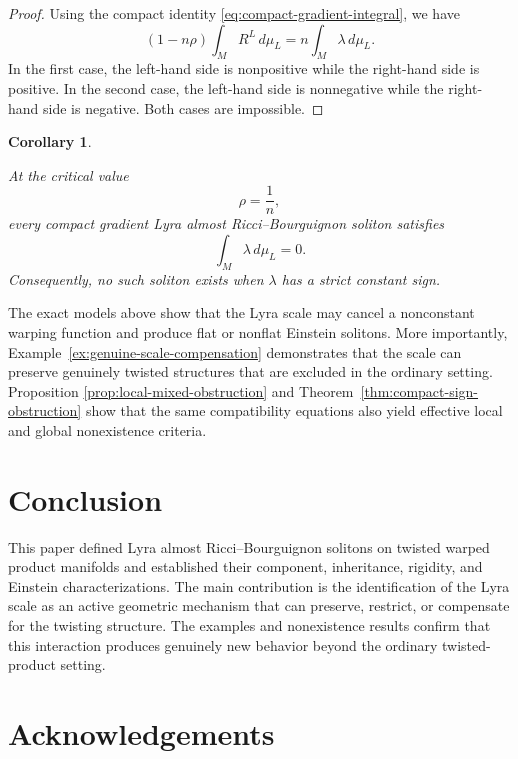 \documentclass[a4paper,11pt]{article}
\theoremstyle{plain}
\newtheorem{corollary} {Corollary}[section]
\numberwithin{equation}{section}
\begin{document}
\begin{proof}
	Using the compact identity
	\eqref{eq:compact-gradient-integral}, we have
	\[
	(1-n\rho)
	\int_{M}R^{L}\,d\mu_{L}
	=
	n
	\int_{M}\lambda\,d\mu_{L}.
	\]
	In the first case, the left-hand side is nonpositive while the
	right-hand side is positive. In the second case, the left-hand
	side is nonnegative while the right-hand side is negative.
	Both cases are impossible.
\end{proof}

\begin{corollary}
	\label{cor:critical-parameter-nonexistence}
	
	At the critical value
	\[
	\rho=\frac1n,
	\]
	every compact gradient Lyra almost Ricci--Bourguignon soliton
	satisfies
	\begin{equation}
		\int_{M}\lambda\,d\mu_{L}=0.
		\label{eq:critical-zero-mean}
	\end{equation}
	Consequently, no such soliton exists when \(\lambda\) has a
	strict constant sign.
\end{corollary}

The exact models above show that the Lyra scale may cancel a
nonconstant warping function and produce flat or nonflat Einstein
solitons. More importantly,
Example~\ref{ex:genuine-scale-compensation} demonstrates that the
scale can preserve genuinely twisted structures that are excluded
in the ordinary setting. Proposition
\ref{prop:local-mixed-obstruction} and
Theorem~\ref{thm:compact-sign-obstruction} show that the same
compatibility equations also yield effective local and global
nonexistence criteria.


\section{Conclusion}
\label{sec:conclusion}

This paper defined Lyra almost Ricci--Bourguignon solitons on
twisted warped product manifolds and established their component,
inheritance, rigidity, and Einstein characterizations. The main
contribution is the identification of the Lyra scale as an active
geometric mechanism that can preserve, restrict, or compensate for
the twisting structure. The examples and nonexistence results confirm
that this interaction produces genuinely new behavior beyond the
ordinary twisted-product setting.





\section*{Acknowledgements}
\end{document}
